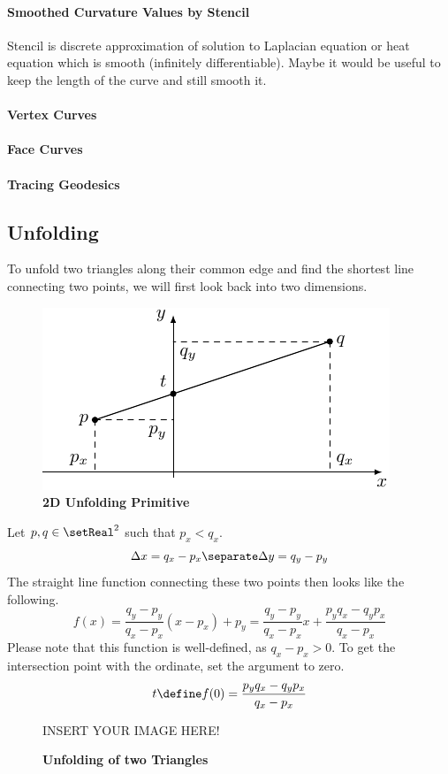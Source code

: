 \documentclass{stdlocal}
\begin{document}
  \paragraph{Smoothed Curvature Values by Stencil}
    Stencil is discrete approximation of solution to Laplacian equation or heat equation which is smooth (infinitely differentiable).
    Maybe it would be useful to keep the length of the curve and still smooth it.
  \paragraph{Vertex Curves}
  \paragraph{Face Curves}
  \paragraph{Tracing Geodesics}

\subsection{Unfolding} %
\label{sub:unfolding}
To unfold two triangles along their common edge and find the shortest line connecting two points, we will first look back into two dimensions.

\begin{figure}[h]
  \centering
  \includegraphics[width=0.6\linewidth]{figures/unfolding_geodesic_2d.pdf}
  \caption[2D Unfolding Primitive]{%
    \textbf{2D Unfolding Primitive}
  }
\end{figure}

Let $p,q\in\setReal^2$ such that $p_x < q_x$.
\[
  \Delta x = q_x - p_x
  \separate
  \Delta y = q_y - p_y
\]
The straight line function connecting these two points then looks like the following.
\[
  f(x) = \frac{q_y - p_y}{q_x - p_x}(x - p_x) + p_y = \frac{q_y - p_y}{q_x - p_x}x + \frac{p_yq_x - q_yp_x}{q_x - p_x}
\]
Please note that this function is well-defined, as $q_x - p_x > 0$.
To get the intersection point with the ordinate, set the argument to zero.
\[
  t\define f(0) = \frac{p_yq_x - q_yp_x}{q_x - p_x}
\]
\begin{figure}[h]
  \begin{center}
    \large
    INSERT YOUR IMAGE HERE!
  \end{center}
  \caption[Unfolding of two Triangles]{%
    \textbf{Unfolding of two Triangles}
  }
\end{figure}
\end{document}
